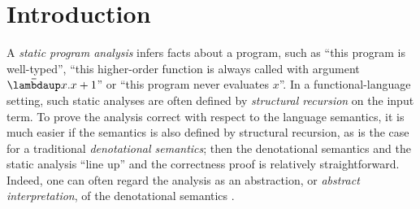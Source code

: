 \section{Introduction}
\label{sec:introduction}

A \emph{static program analysis} infers facts about a program, such
as ``this program is well-typed'', ``this higher-order function is always called
with argument $\Lam{x}{x+1}$'' or ``this program never evaluates $x$''.
In a functional-language setting, such static analyses are
often defined by \emph{structural recursion} on the input term.
To prove the analysis correct with respect to the language semantics,
it is much easier if the semantics is also defined by structural recursion,
as is the case for a traditional \emph{denotational semantics};
then the denotational semantics and the static analysis
``line up'' and the correctness proof is relatively straightforward.
Indeed, one can often regard the analysis as an abstraction, or \emph{abstract interpretation},
of the denotational semantics \cite{Cousot:21}.


